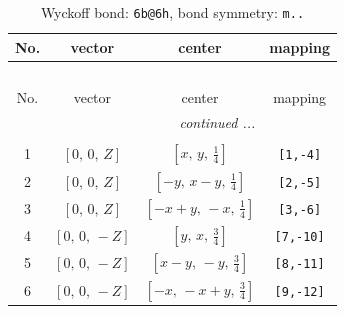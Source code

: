 \documentclass[fleqn,8pt]{jsarticle}
\begin{document}
\begin{longtable}{cccc}
\caption{Wyckoff bond: {\tt 6b@6h}, bond symmetry: {\tt m..}}
 \\
 \hline \hline
No. & vector & center & mapping \\ \hline \endfirsthead

\multicolumn{3}{l}{\tablename\ \thetable{}} \\
 \hline \hline
No. & vector & center & mapping \\ \hline \endhead

 \hline \hline
\multicolumn{3}{r}{\footnotesize\it continued ...} \\ \endfoot

 \hline \hline
\multicolumn{3}{r}{} \\ \endlastfoot

1 & $\left[ 0,\, 0,\, Z \right]$ & $\left[ x,\, y,\, \frac{1}{4} \right]$ & {\tt [1,-4]} \\ \hline
2 & $\left[ 0,\, 0,\, Z \right]$ & $\left[ - y,\, x - y,\, \frac{1}{4} \right]$ & {\tt [2,-5]} \\ \hline
3 & $\left[ 0,\, 0,\, Z \right]$ & $\left[ - x + y,\, - x,\, \frac{1}{4} \right]$ & {\tt [3,-6]} \\ \hline
4 & $\left[ 0,\, 0,\, - Z \right]$ & $\left[ y,\, x,\, \frac{3}{4} \right]$ & {\tt [7,-10]} \\ \hline
5 & $\left[ 0,\, 0,\, - Z \right]$ & $\left[ x - y,\, - y,\, \frac{3}{4} \right]$ & {\tt [8,-11]} \\ \hline
6 & $\left[ 0,\, 0,\, - Z \right]$ & $\left[ - x,\, - x + y,\, \frac{3}{4} \right]$ & {\tt [9,-12]} \\
\end{longtable}
\renewcommand{\arraystretch}{1.2}
\end{document}
